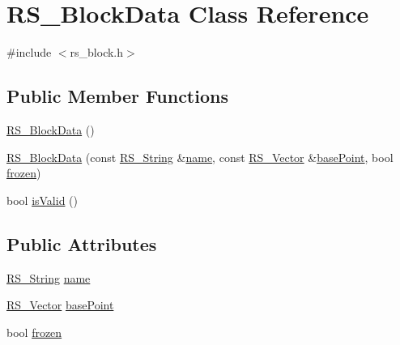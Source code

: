 \hypertarget{class_r_s___block_data}{\section{R\-S\-\_\-\-Block\-Data Class Reference}
\label{class_r_s___block_data}
}


{\ttfamily \#include $<$rs\-\_\-block.\-h$>$}

\subsection*{Public Member Functions}
\begin{DoxyCompactItemize}
\item 
\hyperlink{class_r_s___block_data_a873190db848c93a95bfffb2c4021fee1}{R\-S\-\_\-\-Block\-Data} ()
\item 
\hyperlink{class_r_s___block_data_a3e0541f690371b70e7a762bd3b3bb0cf}{R\-S\-\_\-\-Block\-Data} (const \hyperlink{rs__string_8h_a5adec11f318c2ae2ecdc6fe2b03be9fa}{R\-S\-\_\-\-String} \&\hyperlink{class_r_s___block_data_a763a179ac8c28d3582e1edb8b46561a6}{name}, const \hyperlink{class_r_s___vector}{R\-S\-\_\-\-Vector} \&\hyperlink{class_r_s___block_data_a48e8b52396213dc65ceecd452404d918}{base\-Point}, bool \hyperlink{class_r_s___block_data_af39bcee20f02c196357a8fe84104cf1d}{frozen})
\item 
bool \hyperlink{class_r_s___block_data_aad39b288f978ceeae9ae4d0aac5a2e31}{is\-Valid} ()
\end{DoxyCompactItemize}
\subsection*{Public Attributes}
\begin{DoxyCompactItemize}
\item 
\hyperlink{rs__string_8h_a5adec11f318c2ae2ecdc6fe2b03be9fa}{R\-S\-\_\-\-String} \hyperlink{class_r_s___block_data_a763a179ac8c28d3582e1edb8b46561a6}{name}
\item 
\hyperlink{class_r_s___vector}{R\-S\-\_\-\-Vector} \hyperlink{class_r_s___block_data_a48e8b52396213dc65ceecd452404d918}{base\-Point}
\item 
bool \hyperlink{class_r_s___block_data_af39bcee20f02c196357a8fe84104cf1d}{frozen}
\end{DoxyCompactItemize}


